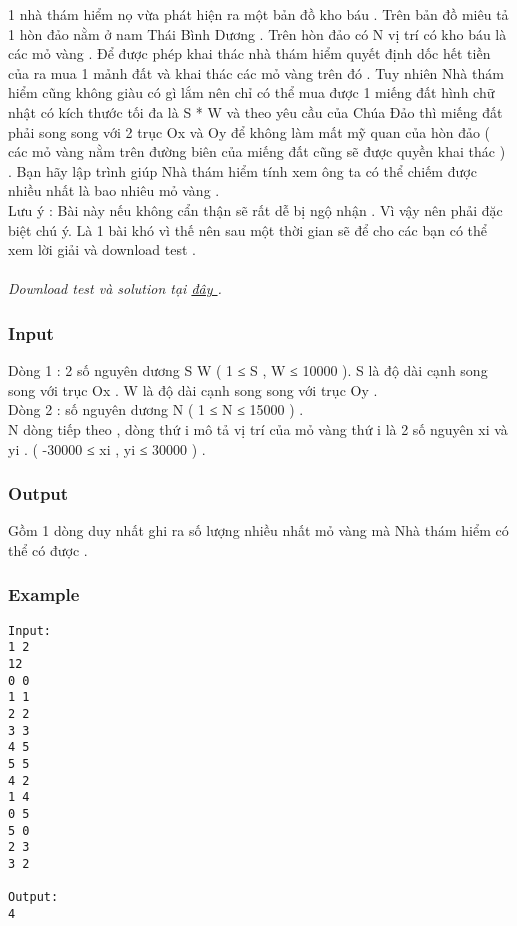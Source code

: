 



   1 nhà thám hiểm nọ vừa phát hiện ra một bản đồ kho báu . Trên bản đồ miêu tả 1 hòn đảo  nằm ở nam Thái Bình Dương . Trên hòn đảo có N vị trí có kho báu là các mỏ vàng . Để được phép khai thác nhà thám hiểm quyết định dốc hết tiền của ra mua 1 mảnh đất và khai thác các mỏ vàng trên đó . Tuy nhiên Nhà thám hiểm cũng không giàu có gì lắm nên chỉ có thể mua được 1 miếng đất hình chữ nhật có kích thước tối đa là S * W và theo yêu cầu của Chúa Đảo thì miếng đất phải song song với 2 trục Ox và Oy để không làm mất mỹ quan của hòn đảo ( các mỏ vàng nằm trên đường biên của miếng đất cũng sẽ được quyền khai thác ) . Bạn hãy lập trình giúp Nhà thám hiểm tính xem ông ta có thể chiếm được nhiều nhất là bao nhiêu mỏ vàng .   
\\       Lưu ý : Bài này nếu không cẩn thận sẽ rất dễ bị ngộ nhận . Vì vậy nên phải đặc biệt chú ý. Là 1 bài khó vì thế nên sau một thời gian sẽ để cho các bạn có thể xem lời giải và download test .      
\\
\\\textit{    Download test và solution tại    \href{http://vn.spoj.pl/content/GOLD.rar}{     đây    }    .   }

\subsubsection{   Input  }

   Dòng 1 : 2 số nguyên dương S W ( 1 ≤ S , W ≤ 10000 ). S là độ dài cạnh song song với trục Ox . W là độ dài cạnh song song với trục Oy .   
\\   Dòng 2 : số nguyên dương N ( 1 ≤ N ≤ 15000 ) .   
\\   N dòng tiếp theo , dòng thứ i mô tả vị trí của mỏ vàng thứ i là 2 số nguyên xi và yi . ( -30000 ≤ xi , yi ≤ 30000 ) .  

\subsubsection{   Output  }

   Gồm 1 dòng duy nhất ghi ra số lượng nhiều nhất mỏ vàng mà Nhà thám hiểm có thể có được .  

\subsubsection{   Example  }
\begin{verbatim}
Input:
1 2
12
0 0
1 1
2 2
3 3
4 5
5 5
4 2
1 4
0 5
5 0
2 3
3 2

Output:
4
\end{verbatim}